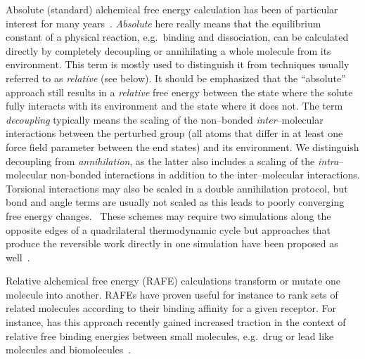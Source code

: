\documentclass[journal=jctcce,manuscript=article]{achemso}
\begin{document}
Absolute (standard) alchemical free energy calculation has been of
particular interest for many years~\cite{GILSON19971047,
  doi:10.1021/jp0217839, deng_computations_2009, ytreberg_comparison_2006, doi:10.1021/ct500964e, jorgensen1988efficient}.  \emph{Absolute}
here really means that the equilibrium constant of a physical
reaction, e.g.\ binding and dissociation, can be calculated directly
by completely decoupling or annihilating a whole molecule from its environment.
This term is mostly used to distinguish it from techniques usually
referred to as \emph{relative} (see below).  It should be emphasized that the
``absolute'' approach still results in a \emph{relative} free energy
between the state where the solute fully interacts with its environment and the state where it does
not.  The term \emph{decoupling} typically means the scaling of the non--bonded
\emph{inter}--molecular interactions between the perturbed group (all atoms
that differ in at least one force field parameter between the end states) and
its environment.  We distinguish decoupling from \emph{annihilation},
as the latter also includes a scaling of
the \emph{intra}--molecular non-bonded interactions in addition to the
inter--molecular interactions.  Torsional interactions may also be scaled in a double annihilation protocol, but bond and angle terms are usually not scaled as this leads to poorly converging free energy changes.~\cite{doi:10.1021/jp981628n}
These schemes may require two
simulations along the opposite edges of a quadrilateral thermodynamic cycle
but approaches that produce the reversible work directly in one simulation
have been proposed as well~\cite{doi:10.1063/1.3519057, C3FD00125C}.

Relative alchemical free energy (RAFE) calculations transform or
mutate one molecule into another.  RAFEs have proven useful for
instance to rank sets of related molecules according to their binding
affinity for a given receptor. For instance, has this approach
recently gained increased traction in the context of relative free
binding energies between small molecules, e.g.\ drug or lead like
molecules and biomolecules~\cite{doi:10.1021/ja512751q,
  doi:10.1021/acs.jctc.6b00991}.
\end{document}
